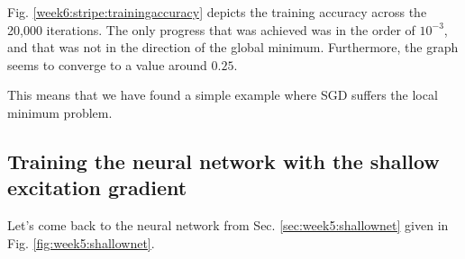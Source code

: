 \documentclass{article}
\begin{document}
Fig. \ref{week6:stripe:trainingaccuracy} depicts the training accuracy across the 20,000 iterations.
The only progress that was achieved was in the order of $10^{-3}$, and that was not in the direction of the global minimum.
Furthermore, the graph seems to converge to a value around $0.25$.

This means that we have found a simple example where SGD suffers the local minimum problem.

\subsection{Training the neural network with the shallow excitation gradient}
Let's come back to the neural network from Sec. \ref{sec:week5:shallownet} given in Fig. \ref{fig:week5:shallownet}.



\end{document}
